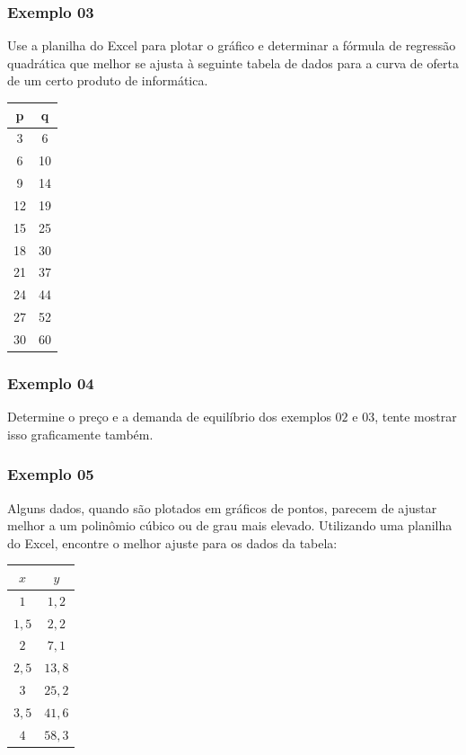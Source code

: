 \documentclass[hyperref={pdfpagelabels=false}]{beamer}
\begin{document}
\begin{frame}
\frametitle{Exemplo 03}

Use a planilha do Excel para plotar o gráfico e determinar a fórmula de regressão quadrática que melhor se ajusta à seguinte tabela de dados para a curva de oferta de um certo produto de informática.

\begin{table}
	\centering
	\begin{tabular}{|c|c|}
		\hline
		p	&	q	\\
		\hline
		3	&	6	\\
		\hline
		6	&	10	\\
		\hline
		9	&	14	\\
		\hline
		12	&	19	\\
		\hline
		15	&	25	\\
		\hline
		18	&	30	\\
		\hline
		21	&	37	\\
		\hline
		24	&	44	\\
		\hline
		27	&	52	\\
		\hline
		30	&	60	\\
		\hline
	\end{tabular}
\end{table}

\end{frame}

\begin{frame}
\frametitle{Exemplo 04}

Determine o preço e a demanda de equilíbrio dos exemplos $02$ e $03$, tente mostrar isso graficamente também.

\end{frame}

\begin{frame}
\frametitle{Exemplo 05}

Alguns dados, quando são plotados em gráficos de pontos, parecem de ajustar melhor a um polinômio cúbico ou de grau mais elevado. Utilizando uma planilha do Excel, encontre o melhor ajuste para os dados da tabela:

\begin{table}[h]
	\centering
	\begin{tabular}{|c|c|}
		\hline
		$x$		&	$y$	\\
		\hline
		$1$		&	$1,2$ \\
		\hline
		$1,5$	&	$2,2$ \\
		\hline
		$2$		&	$7,1$	\\
		\hline
		$2,5$	&	$13,8$	\\
		\hline
		$3$		&	$25,2$	\\
		\hline
		$3,5$	&	$41,6$	\\
		\hline
		$4$		&	$58,3$	\\
		\hline
	\end{tabular}
\end{table}


\end{frame}
\end{document}

